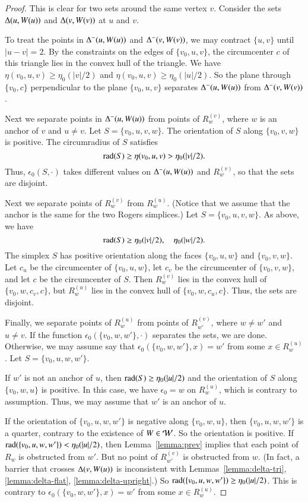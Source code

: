 \begin{proof}
This is clear for two sets around the same vertex $v$.  Consider
the sets $\Delta(u,W(u))$ and $\Delta(v,W(v))$ at $u$ and $v$.

To treat the points in $\Delta^-(u,W(u))$ and $\Delta^-(v,W(v))$, we
may contract $\{u,v\}$ until $|u-v|=2$.  By the constraints on the
edges of $\{v_0,u,v\}$, the circumcenter $c$ of this triangle lies
in the convex hull of the triangle.  We have $\eta(v_0,u,v)\ge
\eta_0(|v|/2)$ and $\eta(v_0,u,v)\ge\eta_0(|u|/2)$.  So the plane
through $\{v_0,c\}$ perpendicular to the plane $\{v_0,u,v\}$ separates
$\Delta^-(u,W(u))$ from $\Delta^-(v,W(v))$.

Next we separate points in $\Delta^-(u,W(u))$ from points of
$R_w^{(v)}$, where $w$ is an anchor of $v$ and $u\ne v$.  Let
$S=\{v_0,u,v,w\}$. The orientation of $S$ along $\{v_0,v,w\}$ is
positive.  The circumradius of $S$ satisfies
    $$
    \operatorname{rad}(S) \ge \eta(v_0,u,v)>\eta_0(|v|/2).
    $$
Thus, $\epsilon_0(S,\cdot)$ takes different values on
$\Delta^-(u,W(u))$ and $R_w^{(v)}$, so that the sets are disjoint.

Next we separate points of $R_w^{(v)}$ from $R_w^{(u)}$.  (Notice
that we assume that the anchor is the same for the two Rogers
simplices.) Let $S=\{v_0,u,v,w\}$.   As above, we have
    $$
    \operatorname{rad}(S) \ge \eta_0(|v|/2), \quad \eta_0(|w|/2).
    $$
The simplex $S$ has positive orientation along the faces
$\{v_0,u,w\}$ and $\{v_0,v,w\}$.  Let $c_u$ be the circumcenter of
$\{v_0,u,w\}$, let $c_v$ be the circumcenter of $\{v_0,v,w\}$, and let
$c$ be the circumcenter of $S$.  Then $R_w^{(v)}$ lies in the
convex hull of $\{v_0,w,c_v,c\}$, but $R_w^{(u)}$ lies in the convex
hull of $\{v_0,w,c_u,c\}$.  Thus, the sets are disjoint.

Finally, we separate points of $R_w^{(u)}$ from points of
$R_{w'}^{(v)}$, where $w\ne w'$ and $u\ne v$.  If the function
$\epsilon_0(\{v_0,w,w'\},\cdot)$ separates the sets, we are done.
Otherwise, we may assume say that $\epsilon_0(\{v_0,w,w'\},x) = w'$
from some $x\in R_w^{(u)}$.  Let $S=\{v_0,u,w,w'\}$.

If $w'$ is not an anchor of $u$, then $\operatorname{rad}(S) \ge\eta_0(|u|/2)$
and the orientation of $S$ along $\{v_0,w,u\}$ is positive.  In this
case, we have $\epsilon_0 = w$ on $R_w^{(u)}$, which is contrary
to assumption. Thus, we may assume that $w'$ is an anchor of $u$.

If the orientation of $\{v_0,u,w,w'\}$ is negative along $\{v_0,w,u\}$,
then $\{v_0,u,w,w'\}$ is a quarter, contrary to the existence of $W\in
{\mathcal W}$.  So the orientation is positive.  If $\operatorname{rad}(\{v_0,u,w,w'\}) <
\eta_0(|u|/2)$, then Lemma~\ref{lemma:prev} implies that each point
of $R_w$ is obstructed from $w'$.  But no point of $R_{w'}^{(v)}$ is
obstructed from $w$. (In fact, a barrier that crosses
$\Delta(v,W(u))$ is inconsistent with Lemmas~\ref{lemma:delta-tri},
\ref{lemma:delta-flat}, \ref{lemma:delta-upright}.) So
$\operatorname{rad}(\{v_0,u,w,w'\}) \ge \eta_0(|u|/2)$.  This is contrary to
$\epsilon_0(\{v_0,w,w'\},x) = w'$ from some $x\in R_w^{(u)}$.
\end{proof}



